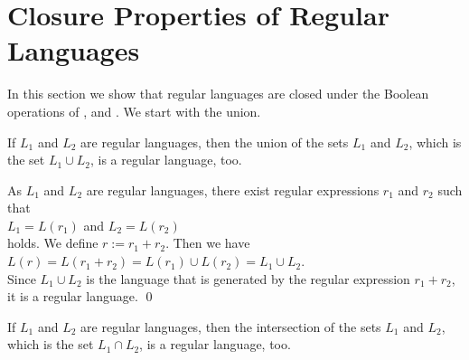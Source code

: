 \section{Closure Properties of Regular Languages}
In this section we show that regular languages are closed under the Boolean operations
of ,  and .  We start with the union.

\begin{Proposition} \label{prop:13}
  If $L_1$ and $L_2$ are regular languages, then the union of the sets $L_1$ and $L_2$, which is the set $L_1 \cup L_2$,
  is a regular language, too. 
\end{Proposition}

\proofEng
As $L_1$ and $L_2$ are regular languages, there exist regular expressions $r_1$ and $r_2$ such that
\\[0.2cm]
\hspace*{1.3cm}
$L_1 = L(r_1)$ \quad and \quad $L_2 = L(r_2)$
\\[0.2cm]
holds.  We define $r := r_1 + r_2$.  Then we have
\\[0.2cm]
\hspace*{1.3cm}
$L(r) = L(r_1 + r_2) = L(r_1) \cup L(r_2) = L_1 \cup L_2$.
\\[0.2cm]
Since $L_1 \cup L_2$ is the language that is generated by the regular expression $r_1 + r_2$, it is a regular language.
\qed  

\begin{Proposition} \label{satz:schnitt}
  If  $L_1$ and $L_2$ are regular languages, then the intersection of the sets $L_1$ and $L_2$, which is the
  set $L_1 \cap L_2$, is a regular language, too. 
\end{Proposition}

